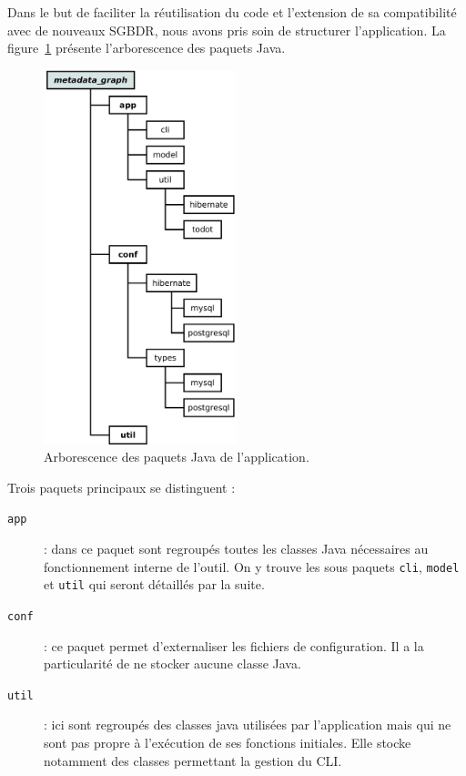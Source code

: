 Dans le but de faciliter la réutilisation du code et l'extension de sa compatibilité avec de nouveaux SGBDR, nous avons pris soin de structurer l'application. La figure~\ref{figure:structure_appli} présente l'arborescence des paquets Java.

\begin{figure}[H]
\centering
\includegraphics[width=0.5\textwidth]{files/archi}
\caption{Arborescence des paquets Java de l'application.}
\label{figure:structure_appli}
\end{figure}

Trois paquets principaux se distinguent :

\begin{description}
\item[\texttt{app}] : dans ce paquet sont regroupés toutes les classes Java nécessaires au fonctionnement interne de l'outil. On y trouve les sous paquets \texttt{cli}, \texttt{model} et \texttt{util} qui seront détaillés par la suite.
\item[\texttt{conf}] : ce paquet permet d'externaliser les fichiers de configuration. Il a la particularité de ne stocker aucune classe Java.
\item[\texttt{util}] : ici sont regroupés des classes java utilisées par l'application mais qui ne sont pas propre à l'exécution de ses fonctions initiales. Elle stocke notamment des classes permettant la gestion du CLI.
\end{description}

